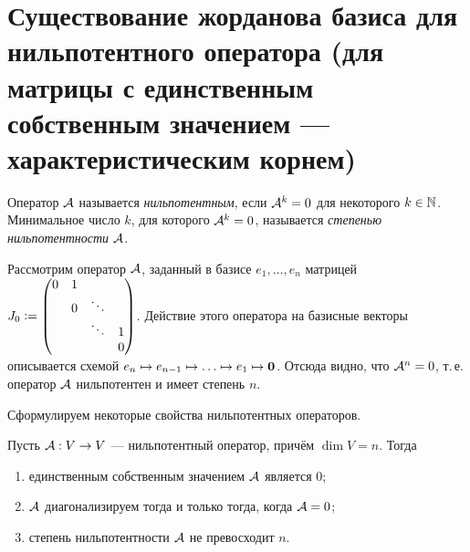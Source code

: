 \section{Существование жорданова базиса для нильпотентного оператора (для матрицы с единственным собственным значением --- характеристическим корнем)}

\begin{definition}
    Оператор $\mathcal{A}$ называется \textit{нильпотентным}, если $\mathcal{A}^k = 0$ для некоторого $k \in \mathbb{N}$. Минимальное число $k$, для которого $\mathcal{A}^k = 0$, называется \textit{степенью нильпотентности} $\mathcal{A}$.
\end{definition}

\begin{example}
    Рассмотрим оператор $\mathcal{A}$, заданный в базисе $e_1, \ldots, e_n$ матрицей
    $ J_0 \vcentcolon =
    \begin{pmatrix}
         0 & 1 & & \\
         & 0 & \ddots & \\
         & & \ddots & 1 \\
         & & & 0 
    \end{pmatrix}
    $. Действие этого оператора на базисные векторы описывается схемой $e_n \mapsto e_{n - 1} \mapsto \ldots \mapsto e_1 \mapsto \boldsymbol{0}$. Отсюда видно, что $\mathcal{A}^n = 0$, т.\,е. оператор $\mathcal{A}$ нильпотентен и имеет степень $n$.
\end{example}

Сформулируем некоторые свойства нильпотентных операторов.

\begin{proposal}
    Пусть $\mathcal{A}: V \to V$ --- нильпотентный оператор, причём $\dim V = n$. Тогда
    \begin{enumerate}[nolistsep]
        \item единственным собственным значением $\mathcal{A}$ является $0$;
        \item $\mathcal{A}$ диагонализируем тогда и только тогда, когда $\mathcal{A} = 0$;
        \item степень нильпотентности $\mathcal{A}$ не превосходит $n$.
    \end{enumerate}
\end{proposal}

